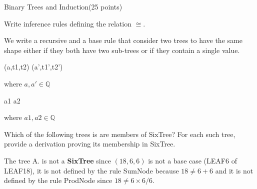 \documentclass{article}
\begin{document}
\newpage
\begin{question}{Binary Trees and Induction}{(25 points)}
\newcommand{\tree}[3]{(#1,#2,#3)}
\newcommand{\TreeSet}{\Set{Tree}\xspace}
\newcommand{\SixTree}{\Set{SixTree}\xspace}
\newcommand{\ROOT}{\ensuremath{\mathit{root}}}
\newcommand{\rootf}[1]{\ROOT(#1)}

  








  
  \begin{subquestion}
    Write inference rules defining the relation $\cong$.

	We write a recursive and a base rule that consider two trees to have the same shape either if they both have two sub-trees or if they contain a single value. 

	{
	
	\tree{a}{t1}{t2} \cong \tree{a'}{t1'}{t2'} 
	}
	{
	where $a, a' \in \mathbb{Q}$
	}

    \infrule[SameShapeBase]
{
}
{
	
	a1 \cong a2
}
{
	where $a1, a2 \in \mathbb{Q}$
}
    
  \end{subquestion}

  \begin{subquestion}
 Which of the following trees is are members of SixTree? For each such tree, provide a derivation
proving its membership in SixTree.


The tree A. is not a \textbf{SixTree} since $\tree{18}{6}{6}$ is not a base case (LEAF6 of LEAF18), it is not defined by the rule SumNode because $18 \ne 6 + 6$ and it is not defined by the rule ProdNode since $18 \ne 6\times6/6$.
  \end{subquestion}


\end{question}
\end{document}
